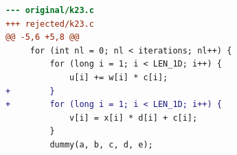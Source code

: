 \begin{lstlisting}[language=diff,basicstyle=\ttfamily\scriptsize,breaklines=true,caption={tsvc_c2/k23 — attempt 1 of 7, rejected by the gate at 'correctness': Program output changed — the patched program is NOT semantically equivalent to the original. / output differs and no numerical slack is in effect}]
--- original/k23.c
+++ rejected/k23.c
@@ -5,6 +5,8 @@
     for (int nl = 0; nl < iterations; nl++) {
         for (long i = 1; i < LEN_1D; i++) {
             u[i] += w[i] * c[i];
+        }
+        for (long i = 1; i < LEN_1D; i++) {
             v[i] = x[i] * d[i] + c[i];
         }
         dummy(a, b, c, d, e);
\end{lstlisting}
